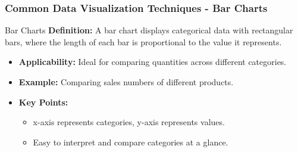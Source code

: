 \documentclass[aspectratio=169]{beamer}
\begin{document}
\begin{frame}[fragile]
    \frametitle{Common Data Visualization Techniques - Bar Charts}
    \begin{block}{Bar Charts}
        \textbf{Definition:} A bar chart displays categorical data with rectangular bars, where the length of each bar is proportional to the value it represents.
    \end{block}
    \begin{itemize}
        \item \textbf{Applicability:} Ideal for comparing quantities across different categories.
        \item \textbf{Example:} Comparing sales numbers of different products.
    \end{itemize}
    \begin{itemize}
        \item \textbf{Key Points:}
        \begin{itemize}
            \item x-axis represents categories, y-axis represents values.
            \item Easy to interpret and compare categories at a glance.
        \end{itemize}
    \end{itemize}
\end{frame}
\end{document}
